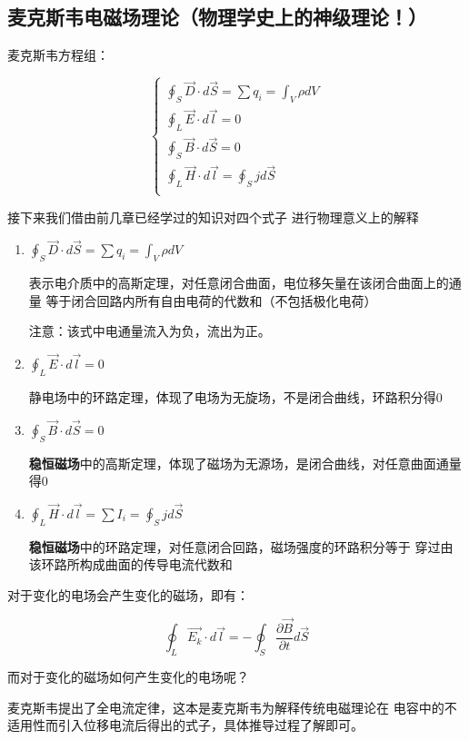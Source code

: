 \documentclass{ctexart}
\begin{document}
\subsection{麦克斯韦电磁场理论（物理学史上的神级理论！）}

麦克斯韦方程组：

\begin{equation*}
	\begin{cases}
		\oint_S \vec{D}·d\vec{S}=\sum q_i=\int_V \rho dV \\
		\oint_L \vec{E}·d\vec{l}=0\\
		\oint_S \vec{B}·d\vec{S}=0\\
		\oint_L \vec{H}·d\vec{l}=\oint_S jd\vec{S}\\
	\end{cases}
\end{equation*}

接下来我们借由前几章已经学过的知识对四个式子
进行物理意义上的解释
\begin{enumerate}
	\item $\oint_S \vec{D}·d\vec{S}=\sum q_i=\int_V \rho dV$
	
	表示电介质中的高斯定理，对任意闭合曲面，电位移矢量在该闭合曲面上的通量
	等于闭合回路内所有自由电荷的代数和（不包括极化电荷）

	注意：该式中电通量流入为负，流出为正。

	\item $\oint_L \vec{E}·d\vec{l}=0$
	
	静电场中的环路定理，体现了电场为无旋场，不是闭合曲线，环路积分得0

	\item $\oint_S \vec{B}·d\vec{S}=0$
	
	\textbf{稳恒磁场}中的高斯定理，体现了磁场为无源场，是闭合曲线，对任意曲面通量得0

	\item $\oint_L \vec{H}·d\vec{l}=\sum I_i=\oint_Sjd\vec{S}$
	
	\textbf{稳恒磁场}中的环路定理，对任意闭合回路，磁场强度的环路积分等于
	穿过由该环路所构成曲面的传导电流代数和
\end{enumerate}

对于变化的电场会产生变化的磁场，即有：

$$\oint_L \vec{E_k}·d\vec{l}=-\oint_S \frac{\partial \vec{B}}
{\partial t}d\vec{S}$$

而对于变化的磁场如何产生变化的电场呢？

麦克斯韦提出了全电流定律，这本是麦克斯韦为解释传统电磁理论在
电容中的不适用性而引入位移电流后得出的式子，具体推导过程了解即可。
\end{document}
